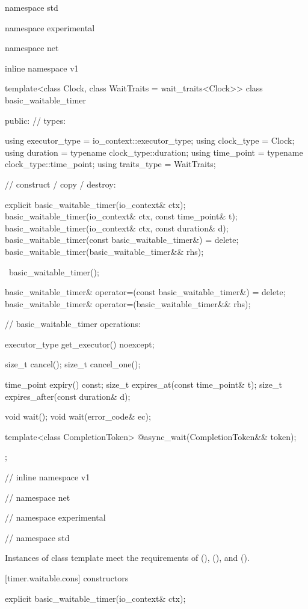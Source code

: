 %
\begin{codeblock}
namespace std {
namespace experimental {
namespace net {
inline namespace v1 {

  template<class Clock, class WaitTraits = wait_traits<Clock>>
  class basic_waitable_timer
  {
  public:
    // types:

    using executor_type = io_context::executor_type;
    using clock_type = Clock;
    using duration = typename clock_type::duration;
    using time_point = typename clock_type::time_point;
    using traits_type = WaitTraits;

    // construct / copy / destroy:

    explicit basic_waitable_timer(io_context& ctx);
    basic_waitable_timer(io_context& ctx, const time_point& t);
    basic_waitable_timer(io_context& ctx, const duration& d);
    basic_waitable_timer(const basic_waitable_timer&) = delete;
    basic_waitable_timer(basic_waitable_timer&& rhs);

    ~basic_waitable_timer();

    basic_waitable_timer& operator=(const basic_waitable_timer&) = delete;
    basic_waitable_timer& operator=(basic_waitable_timer&& rhs);

    // basic_waitable_timer operations:

    executor_type get_executor() noexcept;

    size_t cancel();
    size_t cancel_one();

    time_point expiry() const;
    size_t expires_at(const time_point& t);
    size_t expires_after(const duration& d);

    void wait();
    void wait(error_code& ec);

    template<class CompletionToken>
      @\DEDUCED@ async_wait(CompletionToken&& token);
  };

} // inline namespace v1
} // namespace net
} // namespace experimental
} // namespace std
\end{codeblock}

\pnum
Instances of class template  meet the requirements of  (),  (), and  ().


[timer.waitable.cons]{ constructors}

%
\begin{itemdecl}
explicit basic_waitable_timer(io_context& ctx);
\end{itemdecl}

